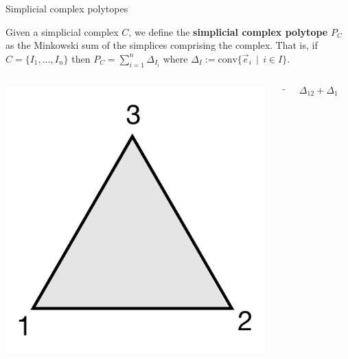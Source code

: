 \documentclass{beamer}
\begin{document}
\begin{frame}{Simplicial complex polytopes}
    \begin{definition}
        Given a simplicial complex $C$, we define the \textbf{simplicial complex polytope} $P_C$ as the Minkowski sum of the simplices comprising the complex. That is, if $C = \{ I_1,\ldots,I_n\}$ then $P_C = \sum_{i=1}^n \Delta_{I_i}$ where $\Delta_I := \text{conv}\{ \Vec{e}_i \, \mid \, i\in I \}$. 
    \end{definition}

\begin{columns}
\hspace{0.5cm}
\begin{column}{0.2\textwidth}
    
    \begin{center}
     \includegraphics[scale=0.06]{images/C_3.png}
     \end{center}
\end{column}
\begin{column}{0.1\textwidth}                $$\longrightarrow$$
\end{column}
\begin{column}{0.3\textwidth}
    $$\Delta_{12}+\Delta_{13}+\Delta_{23}+\Delta_{123}$$
\end{column}
\begin{column}{0.1\textwidth}

\end{column}
\end{columns}
\end{frame}
\end{document}
